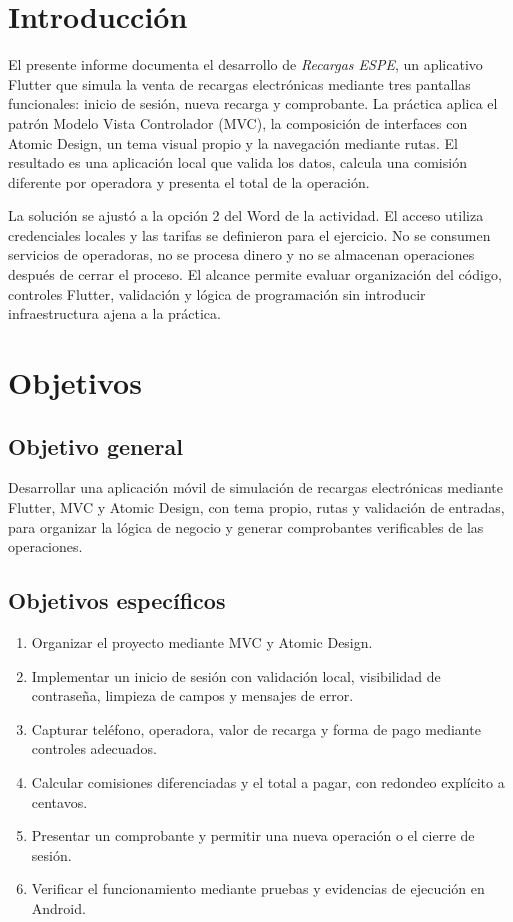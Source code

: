 \documentclass[12pt,letterpaper]{article}
\begin{document}
\section{Introducción}
El presente informe documenta el desarrollo de \textit{Recargas ESPE}, un aplicativo Flutter que simula la venta de recargas electrónicas mediante tres pantallas funcionales: inicio de sesión, nueva recarga y comprobante. La práctica aplica el patrón Modelo Vista Controlador (MVC), la composición de interfaces con Atomic Design, un tema visual propio y la navegación mediante rutas. El resultado es una aplicación local que valida los datos, calcula una comisión diferente por operadora y presenta el total de la operación.

La solución se ajustó a la opción 2 del Word de la actividad. El acceso utiliza credenciales locales y las tarifas se definieron para el ejercicio. No se consumen servicios de operadoras, no se procesa dinero y no se almacenan operaciones después de cerrar el proceso. El alcance permite evaluar organización del código, controles Flutter, validación y lógica de programación sin introducir infraestructura ajena a la práctica.

\section{Objetivos}
\subsection{Objetivo general}
Desarrollar una aplicación móvil de simulación de recargas electrónicas mediante Flutter, MVC y Atomic Design, con tema propio, rutas y validación de entradas, para organizar la lógica de negocio y generar comprobantes verificables de las operaciones.
\subsection{Objetivos específicos}
\begin{enumerate}[leftmargin=*]
\item Organizar el proyecto mediante MVC y Atomic Design.
\item Implementar un inicio de sesión con validación local, visibilidad de contraseña, limpieza de campos y mensajes de error.
\item Capturar teléfono, operadora, valor de recarga y forma de pago mediante controles adecuados.
\item Calcular comisiones diferenciadas y el total a pagar, con redondeo explícito a centavos.
\item Presentar un comprobante y permitir una nueva operación o el cierre de sesión.
\item Verificar el funcionamiento mediante pruebas y evidencias de ejecución en Android.
\end{enumerate}
\end{document}
